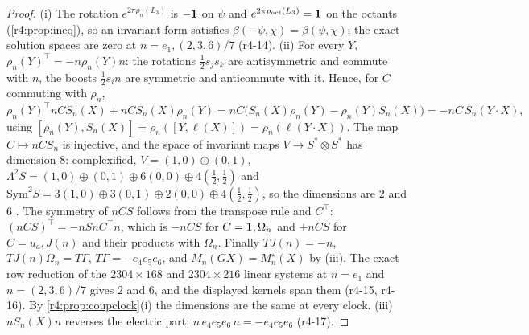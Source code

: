 \begin{proof}
(i) The rotation $e^{2\pi\rho_n(L_3)}$ is $-\mathbf 1$ on $\psi$ and $e^{2\pi\rho_{\rm oct}(L_3)}=\mathbf 1$ on the octants (\cref{r4:prop:ineq}), so an invariant form satisfies
$\beta(-\psi,\chi)=\beta(\psi,\chi)$; the exact solution spaces are zero at $n=e_1,(2,3,6)/7$ (r4-14). (ii) For every $Y$, $\rho_n(Y)^{\!\top}=-n\rho_n(Y)n$: the rotations
$\tfrac12s_js_k$ are antisymmetric and commute with $n$, the boosts $\tfrac12s_in$ are symmetric and anticommute with it. Hence, for $C$ commuting with $\rho_n$,
\[
\rho_n(Y)^{\!\top}nCS_n(X)+nCS_n(X)\rho_n(Y)=nC\bigl(S_n(X)\rho_n(Y)-\rho_n(Y)S_n(X)\bigr)=-nC\,S_n(Y\cdot X),
\]
using $[\rho_n(Y),S_n(X)]=\rho_n([Y,\ell(X)])=\rho_n(\ell(Y\cdot X))$. The map $C\mapsto nCS_n$ is injective, and the space of invariant maps $V\to S^*\otimes S^*$ has
dimension $8$: complexified, $V=(1,0)\oplus(0,1)$, $\Lambda^2S=(1,0)\oplus(0,1)\oplus6(0,0)\oplus4(\tfrac12,\tfrac12)$ and
$\mathrm{Sym}^2S=3(1,0)\oplus3(0,1)\oplus2(0,0)\oplus4(\tfrac12,\tfrac12)$, so the dimensions are $2$ and $6$ \cite{GoodmanWallach}. The symmetry of $nCS$ follows from the transpose
rule and $C^{\!\top}$: $(nCS)^{\!\top}=-nSnC^{\!\top}n$, which is $-nCS$ for $C=\mathbf 1,\Omega_n$ and $+nCS$ for $C=u_a,J(n)$ and their products with $\Omega_n$. Finally
$TJ(n)=-n$, $TJ(n)\Omega_n=T\Gamma$, $T\Gamma=-e_4e_5e_6$, and $M_n(GX)=M^\star_n(X)$ by (iii). The exact row reduction of the $2304\times168$ and $2304\times216$ linear
systems at $n=e_1$ and $n=(2,3,6)/7$ gives $2$ and $6$, and the displayed kernels span them (r4-15, r4-16). By \cref{r4:prop:coupclock}(i) the dimensions are
the same at every clock. (iii) $nS_n(X)n$ reverses the electric part; $n\,e_4e_5e_6\,n=-e_4e_5e_6$ (r4-17).
\end{proof}

